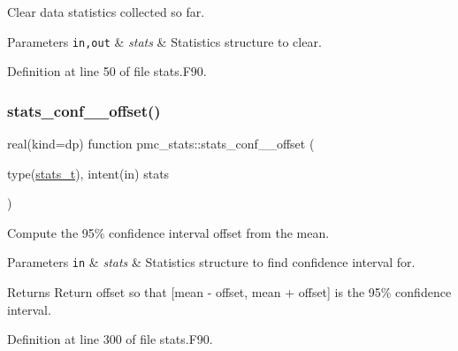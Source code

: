 Clear data statistics collected so far. 


\begin{DoxyParams}[1]{Parameters}
\mbox{\tt in,out}  & {\em stats} & Statistics structure to clear. \\
\hline
\end{DoxyParams}


Definition at line 50 of file stats.\+F90.

\mbox{\label{namespacepmc__stats_a9cecea8dc7d64a4b8800f09e7bc2d54f}} 
\subsubsection{\texorpdfstring{stats\+\_\+conf\+\_\+\_\+offset()}{stats\_conf\_95\_offset()}}
{\footnotesize\ttfamily real(kind=dp) function pmc\+\_\+stats\+::stats\+\_\+conf\+\_\+\_\+offset (\begin{DoxyParamCaption}\item[{type(\mbox{\hyperlink{structpmc__stats_1_1stats__t}{stats\+\_\+t}}), intent(in)}]{stats }\end{DoxyParamCaption})}



Compute the 95\% confidence interval offset from the mean. 


\begin{DoxyParams}[1]{Parameters}
\mbox{\tt in}  & {\em stats} & Statistics structure to find confidence interval for.\\
\hline
\end{DoxyParams}
\begin{DoxyReturn}{Returns}
Return offset so that \mbox{[}mean -\/ offset, mean + offset\mbox{]} is the 95\% confidence interval. 
\end{DoxyReturn}


Definition at line 300 of file stats.\+F90.

\mbox{\label{namespacepmc__stats_a7bd7c2f154323bb763f7bfa0f6e6f9a1}} 
